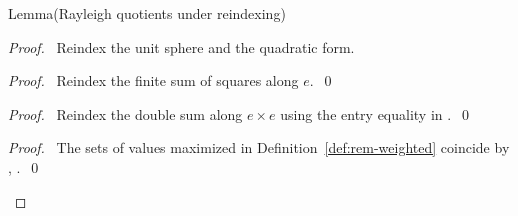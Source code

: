 \begin{namedresult}{Lemma}{(Rayleigh quotients under reindexing)}\label{lem:rem-rayleigh-reindex}
\end{namedresult}
\begin{proof}
\pfsketch\ Reindex the unit sphere and the quadratic form.
\begin{proof}\pf\ Reindex the finite sum of squares along $e$.~\qed\end{proof}
\begin{proof}\pf\ Reindex the double sum along $e\times e$ using
the entry equality in .~\qed\end{proof}
\qedstep
\begin{proof}\pf\ The sets of values maximized in
Definition~\ref{def:rem-weighted} coincide by ,
.~\qed\end{proof}
\end{proof}

